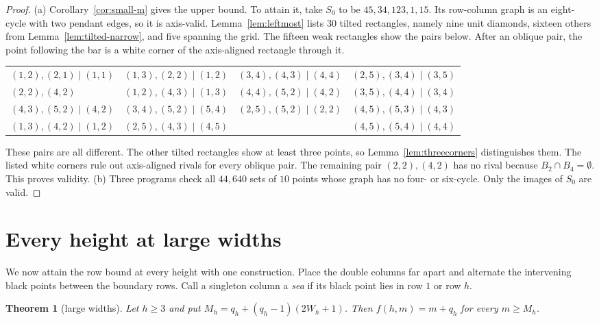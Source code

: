 \documentclass[12pt]{article}
\theoremstyle{plain}
\newtheorem{theorem}{Theorem}
\theoremstyle{definition}
\theoremstyle{remark}
\begin{document}
\begin{proof}
(a) Corollary~\ref{cor:small-m} gives the upper bound. To attain it,
take $S_0$ to be $45,\allowbreak 34,\allowbreak 123,\allowbreak 1,\allowbreak 15$.
Its row-column graph is an eight-cycle with two pendant edges, so it is axis-valid. Lemma~\ref{lem:leftmost} lists $30$ tilted rectangles, namely
nine unit diamonds, sixteen others from Lemma~\ref{lem:tilted-narrow},
and five spanning the grid. The fifteen weak rectangles show the pairs
below. After an oblique pair, the point following the bar is a white
corner of the axis-aligned rectangle through it.
\begin{center}\footnotesize
\begin{tabular}{@{}llll@{}}
$(1,2),(2,1)\mid(1,1)$ & $(1,3),(2,2)\mid(1,2)$ & $(3,4),(4,3)\mid(4,4)$ & $(2,5),(3,4)\mid(3,5)$ \\
$(2,2),(4,2)$ & $(1,2),(4,3)\mid(1,3)$ & $(4,4),(5,2)\mid(4,2)$ & $(3,5),(4,4)\mid(3,4)$ \\
$(4,3),(5,2)\mid(4,2)$ & $(3,4),(5,2)\mid(5,4)$ & $(2,5),(5,2)\mid(2,2)$ & $(4,5),(5,3)\mid(4,3)$ \\
$(1,3),(4,2)\mid(1,2)$ & $(2,5),(4,3)\mid(4,5)$ & & $(4,5),(5,4)\mid(4,4)$ \\
\end{tabular}
\end{center}
These pairs are all different. The other tilted rectangles show at least
three points, so Lemma~\ref{lem:threecorners} distinguishes them.
The listed white corners rule out axis-aligned rivals for every oblique
pair. The remaining pair $(2,2),(4,2)$ has no rival because
$B_2\cap B_4=\emptyset$. This proves validity.
(b) Three programs check all $44{,}640$ sets of $10$ points whose graph
has no four- or six-cycle. Only the images of $S_0$ are valid.
\end{proof}
\section{Every height at large widths}\label{sec:general}

We now attain the row bound at every height with one construction.
Place the double columns far apart and alternate the intervening black points
between the boundary rows. Call a singleton column a \emph{sea} if its black
point lies in row $1$ or row $h$.

\begin{theorem}[large widths]\label{thm:general}
Let $h\ge3$ and put $M_h=q_h+(q_h-1)(2W_h+1)$. Then $f(h,m)=m+q_h$ for every $m\ge M_h$.
\end{theorem}
\end{document}
